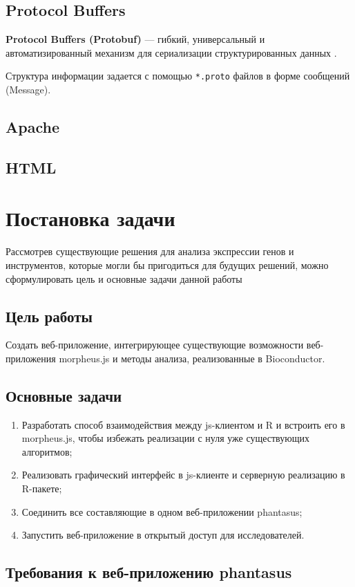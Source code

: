 \documentclass[annotation,specification]{itmo-student-thesis}
\begin{document}
\subsection{Protocol Buffers}
\textbf{Protocol Buffers (Protobuf)} --- гибкий, универсальный и автоматизированный механизм для сериализации структурированных данных \cite{protobuf}.

Структура информации задается с помощью \texttt{*.proto} файлов в форме сообщений (Message).

\subsection{Apache}
\subsection{HTML}

\section{Постановка задачи}
Рассмотрев существующие решения для анализа экспрессии генов и инструментов, которые могли бы пригодиться для будущих решений, можно сформулировать цель и основные задачи данной работы

\subsection{Цель работы}
Создать веб-приложение, интегрирующее существующие возможности веб-приложения morpheus.js и методы анализа, реализованные в Bioconductor.

\subsection{Основные задачи}
\begin{enumerate}
\item Разработать способ взаимодействия между js-клиентом и R и встроить его в morpheus.js, чтобы избежать реализации с нуля уже существующих алгоритмов;
\item Реализовать графический интерфейс в js-клиенте и серверную реализацию в R-пакете;
\item Соединить все составляющие в одном веб-приложении phantasus;
\item Запустить веб-приложение в открытый доступ для исследователей.
\end{enumerate}

\subsection{Требования к веб-приложению phantasus}
\end{document}
